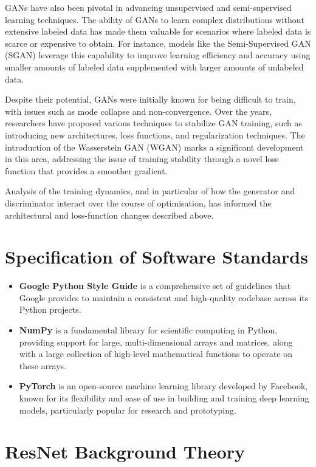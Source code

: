 GANs have also been pivotal in advancing unsupervised and semi-supervised learning techniques. The
ability of GANs to learn complex distributions without extensive labeled data has made them valuable
for scenarios where labeled data is scarce or expensive to obtain. For instance, models like the
Semi-Supervised GAN (SGAN) \parencite{arXiv:1606.01583} leverage this capability to improve learning
efficiency and accuracy using smaller amounts of labeled data supplemented with larger amounts of
unlabeled data.

Despite their potential, GANs were initially known for being difficult to train, with issues such as
mode collapse and non-convergence. Over the years, researchers have proposed various techniques to
stabilize GAN training, such as introducing new architectures, loss functions, and regularization
techniques. The introduction of the Wasserstein GAN (WGAN) \parencite{arXiv:1701.07875} marks a
significant development in this area, addressing the issue of training stability through a novel
loss function that provides a smoother gradient.

Analysis of the training dynamics, and in particular of how the generator and discriminator interact
over the course of optimisation, has informed the architectural and loss-function changes described
above.

\section{Specification of Software Standards}

\begin{itemize}
    \item \textbf{Google Python Style Guide} is a comprehensive set of guidelines that Google provides to maintain a consistent and high-quality codebase across its Python projects.
    \item \textbf{NumPy} is a fundamental library for scientific computing in Python, providing support for large, multi-dimensional arrays and matrices, along with a large collection of high-level mathematical functions to operate on these arrays.
    \item \textbf{PyTorch} is an open-source machine learning library developed by Facebook, known for its flexibility and ease of use in building and training deep learning models, particularly popular for research and prototyping.    
\end{itemize}

\section{ResNet Background Theory}

